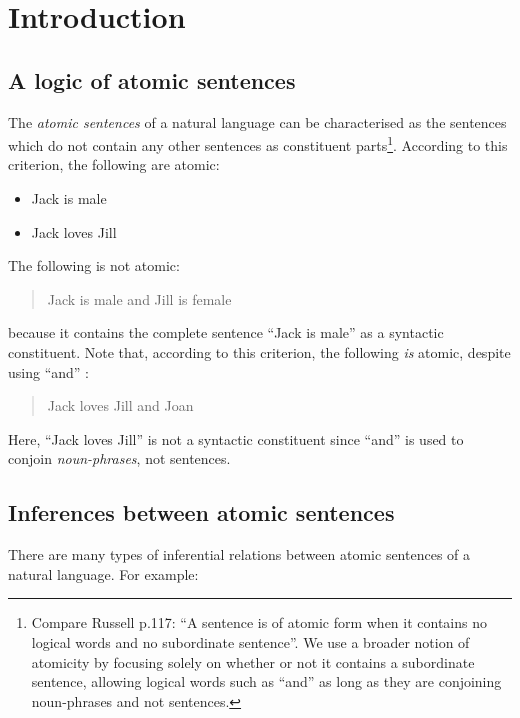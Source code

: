 \section{Introduction}\label{introduction}



\subsection{A logic of atomic sentences}

\NI The \emph{atomic sentences} of a natural language can be
characterised as the sentences which do not contain any other
sentences as constituent parts\footnote{Compare Russell \cite{russell}
  p.117: ``A sentence is of atomic form when it contains no logical
  words and no subordinate sentence''. We use a broader notion of
  atomicity by focusing solely on whether or not it contains a
  subordinate sentence, allowing logical words such as ``and'' as long
  as they are conjoining noun-phrases and not sentences.}.  According
to this criterion, the following are atomic:

\begin{itemize}

\item Jack is male
\item Jack loves Jill
\end{itemize}

\NI The following is not atomic:

\begin{quote}
  Jack is male and Jill is female
\end{quote}

\NI because it contains the complete sentence ``Jack is male'' as a
syntactic constituent.  Note that, according to this criterion, the
following \emph{is} atomic, despite using ``and'' :

\begin{quote}
  Jack loves Jill and Joan
\end{quote}

\NI Here, ``Jack loves Jill'' is not a syntactic constituent since
``and'' is used to conjoin \emph{noun-phrases}, not sentences.

\subsection{Inferences between atomic sentences}

\NI There are many types of inferential relations between atomic
sentences of a natural language.  For example:

